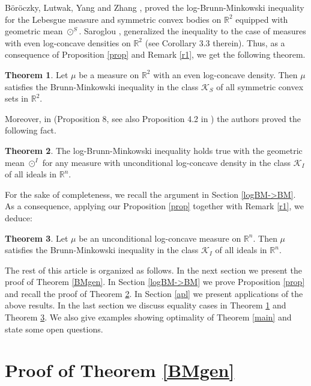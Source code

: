 \documentclass[11pt]{article}
\newcommand{\mb}[1]{\mathbb{{#1}}}
\newcommand{\mc}[1]{\mathcal{{#1}}}
\newcommand{\1}{\mathbf{{1}}}
\theoremstyle{definition}
\newtheorem{thm}{Theorem}
\begin{document}
B\"or\"oczky,  Lutwak,  Yang and  Zhang \cite{BLYZ1}, proved the log-Brunn-Minkowski inequality for the Lebesgue measure and symmetric convex bodies  on  $\mb{R}^2$ equipped  with geometric mean $\odot^S$.  Saroglou \cite{S2}, generalized the inequality to the case of  measures with even log-concave densities  on  $\mb{R}^2$  (see Corollary 3.3 therein). Thus, as a consequence of Proposition \ref{prop} and Remark \ref{r1}, we get the following theorem.

\begin{thm}\label{symBM}
Let $\mu$ be a measure on $\mb{R}^2$ with an even log-concave density. Then $\mu$ satisfies the Brunn-Minkowski inequality in the class $\mc{K}_S$ of all symmetric convex sets in $\mb{R}^2$.
\end{thm}

\noindent Moreover, in \cite{CFM} (Proposition 8, see also Proposition 4.2 in \cite{S1}) the authors proved the following fact.

\begin{thm}\label{uncondlogBM}
The log-Brunn-Minkowski inequality holds true with the geometric mean $\odot^I$ for any measure with unconditional log-concave density in the class $\mc{K}_I$ of all ideals in $\mb{R}^n$.
\end{thm}

\noindent For the sake of completeness, we recall the argument in Section \ref{logBM->BM}. As a consequence, applying our Proposition \ref{prop} together with Remark \ref{r1}, we deduce:

\begin{thm}\label{uncondBM}
Let $\mu$ be an unconditional log-concave measure on $\mb{R}^n$. Then $\mu$ satisfies the Brunn-Minkowski inequality in the class $\mc{K}_I$ of all ideals in $\mb{R}^n$.
\end{thm}





The rest of this article is organized as follows. In the next section we present the proof of Theorem \ref{BMgen}.  In Section \ref{logBM->BM} we prove Proposition \ref{prop} and recall the proof of Theorem \ref{uncondlogBM}. In Section \ref{apl} we present applications of the above results. In the last section we discuss equality cases in Theorem \ref{symBM} and Theorem \ref{uncondBM}. We  also give examples showing optimality of Theorem \ref{main} and state some open questions.


\section{Proof of Theorem \ref{BMgen}}
\end{document}
